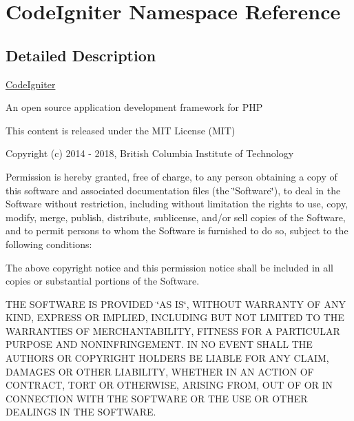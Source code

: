 \hypertarget{namespace_code_igniter}{}\section{Code\+Igniter Namespace Reference}
\label{namespace_code_igniter}


\subsection{Detailed Description}
\mbox{\hyperlink{namespace_code_igniter}{Code\+Igniter}}

An open source application development framework for P\+HP

This content is released under the M\+IT License (M\+IT)

Copyright (c) 2014 -\/ 2018, British Columbia Institute of Technology

Permission is hereby granted, free of charge, to any person obtaining a copy of this software and associated documentation files (the \char`\"{}\+Software\char`\"{}), to deal in the Software without restriction, including without limitation the rights to use, copy, modify, merge, publish, distribute, sublicense, and/or sell copies of the Software, and to permit persons to whom the Software is furnished to do so, subject to the following conditions\+:

The above copyright notice and this permission notice shall be included in all copies or substantial portions of the Software.

T\+HE S\+O\+F\+T\+W\+A\+RE IS P\+R\+O\+V\+I\+D\+ED \char`\"{}\+A\+S I\+S\char`\"{}, W\+I\+T\+H\+O\+UT W\+A\+R\+R\+A\+N\+TY OF A\+NY K\+I\+ND, E\+X\+P\+R\+E\+SS OR I\+M\+P\+L\+I\+ED, I\+N\+C\+L\+U\+D\+I\+NG B\+UT N\+OT L\+I\+M\+I\+T\+ED TO T\+HE W\+A\+R\+R\+A\+N\+T\+I\+ES OF M\+E\+R\+C\+H\+A\+N\+T\+A\+B\+I\+L\+I\+TY, F\+I\+T\+N\+E\+SS F\+OR A P\+A\+R\+T\+I\+C\+U\+L\+AR P\+U\+R\+P\+O\+SE A\+ND N\+O\+N\+I\+N\+F\+R\+I\+N\+G\+E\+M\+E\+NT. IN NO E\+V\+E\+NT S\+H\+A\+LL T\+HE A\+U\+T\+H\+O\+RS OR C\+O\+P\+Y\+R\+I\+G\+HT H\+O\+L\+D\+E\+RS BE L\+I\+A\+B\+LE F\+OR A\+NY C\+L\+A\+IM, D\+A\+M\+A\+G\+ES OR O\+T\+H\+ER L\+I\+A\+B\+I\+L\+I\+TY, W\+H\+E\+T\+H\+ER IN AN A\+C\+T\+I\+ON OF C\+O\+N\+T\+R\+A\+CT, T\+O\+RT OR O\+T\+H\+E\+R\+W\+I\+SE, A\+R\+I\+S\+I\+NG F\+R\+OM, O\+UT OF OR IN C\+O\+N\+N\+E\+C\+T\+I\+ON W\+I\+TH T\+HE S\+O\+F\+T\+W\+A\+RE OR T\+HE U\+SE OR O\+T\+H\+ER D\+E\+A\+L\+I\+N\+GS IN T\+HE S\+O\+F\+T\+W\+A\+RE.

